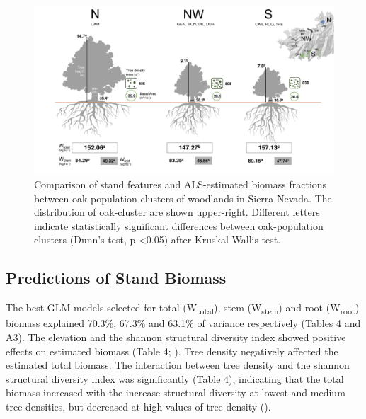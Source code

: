 \begin{figure}
    \centering
    \includegraphics[width=\textwidth]{img/carbon/carbon-esquema-compara2.jpg}
    \caption{Comparison of stand features and ALS-estimated biomass fractions between oak-population clusters of \Qpy woodlands in Sierra Nevada. The distribution of oak-cluster are shown upper-right. Different letters indicate statistically significant differences between oak-population clusters (Dunn's test, p \textless 0.05) after Kruskal-Wallis test.}
    \label{fig:carbon:schema}
\end{figure}

\subsection{Predictions of Stand Biomass}\label{sec:carbon:results-prediction}
The best GLM models selected for total (W\textsubscript{total}), stem (W\textsubscript{stem}) and root (W\textsubscript{root}) biomass explained 70.3\%, 67.3\% and 63.1\% of variance respectively (Tables 4 and A3). The elevation and the shannon structural diversity index showed positive effects on estimated biomass (Table 4; ). Tree density negatively affected the estimated total biomass. The interaction between tree density and the shannon structural diversity index was significantly (Table 4), indicating that the total biomass increased with the increase structural diversity at lowest and medium tree densities, but decreased at high values of tree density ().

